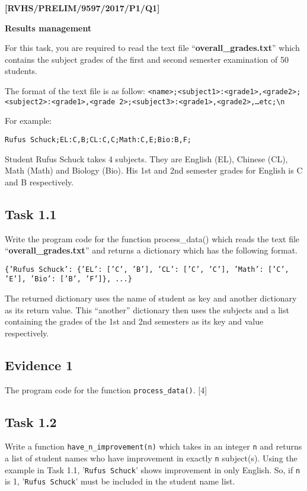 \item \textbf{{[}RVHS/PRELIM/9597/2017/P1/Q1{]} }

\textbf{Results management }

For this task, you are required to read the text file \textquotedblleft \textbf{overall\_grades.txt}\textquotedblright{}
which contains the subject grades of the first and second semester
examination of 50 students.

The format of the text file is as follow: \texttt{<name>;<subject1>:<grade1>,<grade2>;<subject2>:<grade1>,<grade
2>;<subject3>:<grade1>,<grade2>,\dots etc;\textbackslash n }

For example: 

\texttt{Rufus Schuck;EL:C,B;CL:C,C;Math:C,E;Bio:B,F; }

Student Rufus Schuck takes 4 subjects. They are English (EL), Chinese
(CL), Math (Math) and Biology (Bio). His 1st and 2nd semester grades
for English is C and B respectively. 

\subsection*{Task 1.1 }

Write the program code for the function process\_data() which reads
the text file \textquotedblleft \textbf{overall\_grades.txt}\textquotedblright{}
and returns a dictionary which has the following format. 

\texttt{\{'Rufus Schuck': \{'EL': {[}'C', 'B'{]}, 'CL': {[}'C', 'C'{]},
'Math': {[}'C', 'E'{]}, 'Bio': {[}'B', 'F'{]}\}, ...\} }

The returned dictionary uses the name of student as key and another
dictionary as its return value. This \textquotedblleft another\textquotedblright{}
dictionary then uses the subjects and a list containing the grades
of the 1st and 2nd semesters as its key and value respectively. 

\subsection*{Evidence 1 }

The program code for the function \texttt{process\_data()}. \hfill{}{[}4{]}

\subsection*{Task 1.2}

Write a function \texttt{have\_n\_improvement(n)} which takes in an
integer \texttt{n} and returns a list of student names who have improvement
in exactly \texttt{n} subject(s). Using the example in Task 1.1, '\texttt{Rufus
Schuck}' shows improvement in only English. So, if \texttt{n} is 1,
'\texttt{Rufus Schuck}' must be included in the student name list. 

